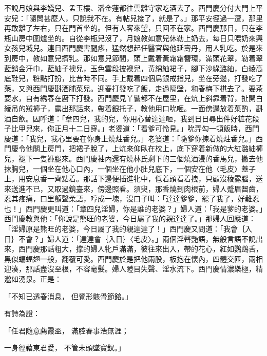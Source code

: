 \begin{showcontents}{}
不說月娘與李嬌兒、孟玉樓、潘金蓮都往雲離守家吃酒去了。西門慶分付大門上平安兒：「隨問甚麼人，只說我不在。有帖兒接了，就是了。」那平安徑過一遭，那里再敢離了左右，只在門首坐的。但有人客來望，只回不在家。西門慶那日，只在李瓶山房中圍爐坐的。自從李瓶兒沒了，月娘教如意兒休勒上奶去，每日只喂奶來興女孩兒城兒。連日西門慶害腿疼，猛然想起任醫官與他延壽丹，用人乳吃。於是來到房中，教如意兒擠乳。那如意兒節間，頭上戴着黃霜霜簪環，滿頭花翠，勒着翠藍銷金汗巾，藍紬子襖兒，玉色雲段披襖兒，黃綿紬裙子，腳下沙綠潞紬，白綾高底鞋兒，粧點打扮，比昔時不同。手上戴着四個烏銀戒指兒，坐在旁邊，打發吃了藥，又與西門慶斟酒脯菜兒。迎春打發吃了飯，走過隔壁，和春梅下棋去了。要茶要水，自有綉春在廚下打發。西門慶見丫鬟都不在屋里，在炕上斜靠着背，扯開白綾吊的羢褲子，露出那話來，帶着銀托子，教他用口吮咂。一面傍邊放着菓酌，斟酒自飲。因呼道：「章四兒，我的兒，你用心替達達咂，我到日日尋出件好粧花段子比甲兒來，你正月十二日穿。」老婆道：「看爹可怜見。」吮弄勾一頓飯時，西門慶道：「我兒，我心里要在你身上燒炷香兒。」老婆道：「隨爹你揀着燒炷香兒。」西門慶令他關上房門，把裙子脫了，上炕來仰臥在枕上，底下穿着新做的大紅潞紬褲兒，褪下一隻褲腿來。西門慶袖內還有燒林氏剩下的三個燒酒浸的香馬兒，撇去他抹胸兒，一個坐在他心口內，一個坐在他小肚兒底下，一個安在他〈毛皮〉蓋子上，用安息香一齊點着。那話下邊便插進牝中，低着頭看着拽，只顧沒稜露腦，送來送進不已，又取過鏡臺來，傍邊照看。須臾，那香燒到肉根前，婦人蹙眉齧齒，忍其疼痛，口里顫聲柔語，哼成一塊，沒口子叫：「達達爹爹，罷了我了，好難忍也！」西門慶更叫道：「章四兒淫婦，你是誰的老婆？」婦人道：「我是爹的老婆。」西門慶教與他：「你說是熊旺的老婆，今日屬了我的親達達了。」那婦人回應道：「淫婦原是熊旺的老婆，今日屬了我的親達達了！」西門慶又問道：「我會｛入日｝不會？」婦人道：「達達會｛入日｝〈毛皮〉。」兩個淫聲艷語，無般言語不說出來，西門慶那話粗大，撑的婦人牝戶滿滿，彼往來出入，帶的花心，紅如鸚鵡舌，黑似蝙蝠翅一般，翻覆可愛。西門慶於是把他兩股，板抱在懷內，四體交匝，兩相迎湊，那話盡沒至根，不容毫髮。婦人瞪目失聲、淫水流下。西門慶情濃樂極，精邈如湧泉。正是：

「不知已透春消息，  但覺形骸骨節鎔。」

有詩為證：

「任君隨意薦霞盃，  滿腔春事浩無涯；

一身徑藉東君愛，  不管未頭墜寶釵。」


\end{showcontents}
